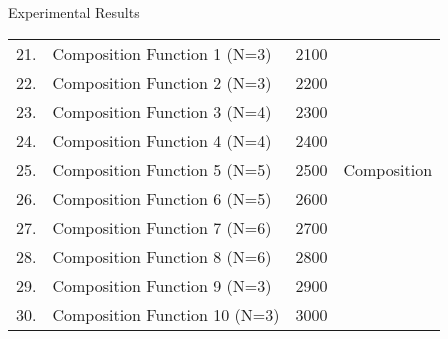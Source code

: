 \documentclass [9pt,times] {beamer}
\begin{document}
\begin{frame}{Experimental Results}
\begin{center}
\begin{tabular}{p{0.2in}   p{2.5in}   p{0.4in} p{0.7in}}
\hline
21. & Composition Function 1 (N=3) & 2100 &  \\
22. & Composition Function 2 (N=3) & 2200 & \\
23. & Composition Function 3 (N=4) & 2300 & \\
24. & Composition Function 4 (N=4) & 2400 & \\
25. & Composition Function 5 (N=5) & 2500 & Composition \\
26. & Composition Function 6 (N=5) & 2600 & \\
27. & Composition Function 7 (N=6) & 2700 & \\
28. & Composition Function 8 (N=6) & 2800 & \\
29. & Composition Function 9 (N=3) & 2900 & \\
30. & Composition Function 10 (N=3) & 3000 &  \\
\hline
\end{tabular}
\end{center}
\end{frame}


\end{document}
